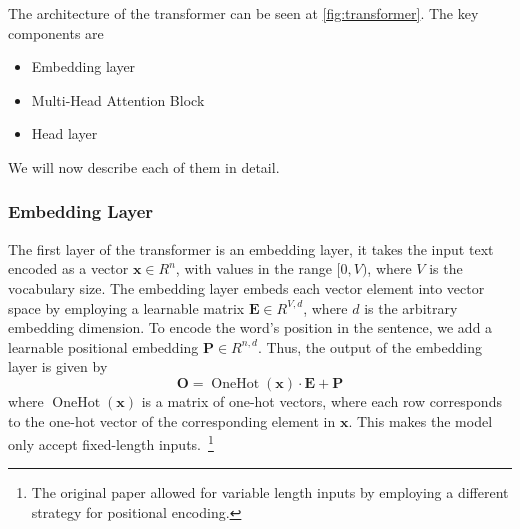 The architecture of the transformer can be seen at \autoref{fig:transformer}.
The key components are
\begin{itemize}
    \item Embedding layer
    \item Multi-Head Attention Block
    \item Head layer
\end{itemize}
We will now describe each of them in detail.
\subsubsection{Embedding Layer}
The first layer of the transformer is an embedding layer, it takes the input text encoded as a vector $\mathbf{x} \in R^{n}$, with values in the range $[0, V)$, where $V$ is the vocabulary size.
The embedding layer embeds each vector element into vector space by employing a learnable matrix $\mathbf{E} \in R^{V, d}$, where $d$ is the arbitrary embedding dimension.
To encode the word's position in the sentence, we add a learnable positional embedding $\mathbf{P} \in R^{n, d}$.
Thus, the output of the embedding layer is given by
\begin{equation}
    \mathbf{O} = \operatorname{OneHot}(\mathbf{x}) \cdot \mathbf{E} + \mathbf{P}
\end{equation}
where $\operatorname{OneHot}(\mathbf{x})$ is a matrix of one-hot vectors, where each row corresponds to the one-hot vector of the corresponding element in $\mathbf{x}$.
This makes the model only accept fixed-length inputs.~\footnote{The original paper allowed for variable length inputs by employing a different strategy for positional encoding.}

